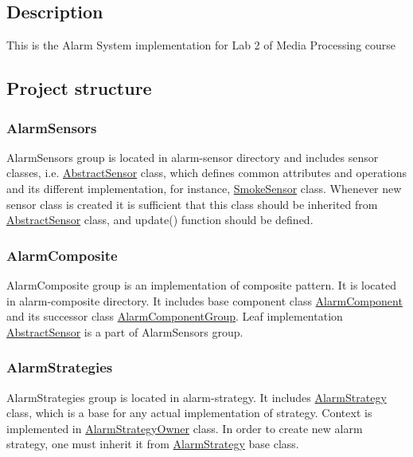 \subsection*{Description}

This is the Alarm System implementation for Lab 2 of Media Processing course

\subsection*{Project structure}

\subsubsection*{Alarm\+Sensors}

Alarm\+Sensors group is located in {\ttfamily alarm-\/sensor} directory and includes sensor classes, i.\+e. {\ttfamily \hyperlink{classAbstractSensor}{Abstract\+Sensor}} class, which defines common attributes and operations and its different implementation, for instance, {\ttfamily \hyperlink{classSmokeSensor}{Smoke\+Sensor}} class. Whenever new sensor class is created it is sufficient that this class should be inherited from {\ttfamily \hyperlink{classAbstractSensor}{Abstract\+Sensor}} class, and {\ttfamily update()} function should be defined.

\subsubsection*{Alarm\+Composite}

Alarm\+Composite group is an implementation of composite pattern. It is located in {\ttfamily alarm-\/composite} directory. It includes base component class {\ttfamily \hyperlink{classAlarmComponent}{Alarm\+Component}} and its successor class {\ttfamily \hyperlink{classAlarmComponentGroup}{Alarm\+Component\+Group}}. Leaf implementation {\ttfamily \hyperlink{classAbstractSensor}{Abstract\+Sensor}} is a part of Alarm\+Sensors group.

\subsubsection*{Alarm\+Strategies}

Alarm\+Strategies group is located in {\ttfamily alarm-\/strategy}. It includes {\ttfamily \hyperlink{classAlarmStrategy}{Alarm\+Strategy}} class, which is a base for any actual implementation of strategy. Context is implemented in {\ttfamily \hyperlink{classAlarmStrategyOwner}{Alarm\+Strategy\+Owner}} class. In order to create new alarm strategy, one must inherit it from {\ttfamily \hyperlink{classAlarmStrategy}{Alarm\+Strategy}} base class.

